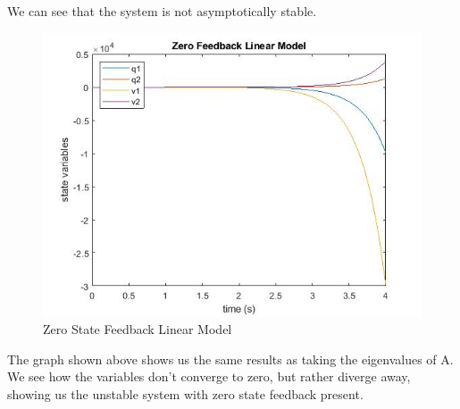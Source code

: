 \documentclass[12pt]{article}
\begin{document}
We can see that the system is not asymptotically stable.
\begin{figure}[H]
	\centering
	\includegraphics[width=0.8\linewidth]{Zero feedback linear model.jpg}
	\caption{Zero State Feedback Linear Model}
\end{figure}
The graph shown above shows us the same results as taking the eigenvalues of A. We see how the variables don't converge to zero, but rather diverge away, showing us the unstable system with zero state feedback present. \\
\end{document}
